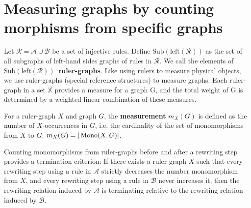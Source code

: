 
\section{Measuring graphs by counting morphisms from specific graphs}
\label{subgraph_counting:sec:interpretation}
Let $\mathcal{R} = \mathcal{A} \cup \mathcal{B}$ be a set of injective rules.
Define $\mathrm{Sub}(\mathrm{left}(\mathcal{R}))$ as the set of all subgraphs of left-hand sides graphs of rules in $\mathcal{R}$.
We call the elements of $\mathrm{Sub}(\mathrm{left}(\mathcal{R}))$~\textbf{ruler-graphs}. Like using rulers to measure physical objects, we use ruler-graphs (special reference structures) to measure graphs.
Each ruler-graph in a set $\mathbb{X}$ provides a measure for a graph
G, and the total weight of G is determined by a weighted linear
combination of these measures.

\begin{definition}[Measurement]
    \label{subgraph_counting:def:measurement}
    For a ruler-graph \( X \) and graph \( G \), the \textbf{measurement} \( m_X(G) \) is defined as the number of $X$-occurrences in $G$, i.e. the cardinality of the set of monomorphisms from $ X $ to $ G $:
    \(
        m_X(G) = |\operatorname{Mono}(X, G)|
    \).
\end{definition} 
Counting monomorphisms from ruler-graphs before and after a rewriting step provides a termination criterion: 
    If there exists a ruler-graph $X$ such that every rewriting step using a rule in $\mathcal{A}$ strictly decreases the number monomorphism from $X$, and every rewriting step using a rule in $\mathcal{B}$ never increases it, then the rewriting relation induced by $\mathcal{A}$ is terminating relative to the rewriting relation induced by $\mathcal{B}$.
 
